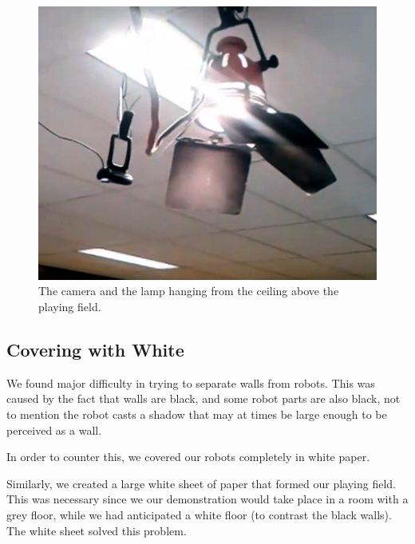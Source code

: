 \documentclass[10pt, abstracton]{scrartcl}
\begin{document}
\begin{figure}
	\centering
	\includegraphics[width=\columnwidth]{pictures/photo2.png}
	\caption{\small The camera and the lamp hanging from the ceiling above the playing field.}
	\label{fig:photo2}
\end{figure}

\subsection{Covering with White}
We found major difficulty in trying to separate walls from robots. This was caused by the fact that walls are black, and some robot parts are also black, not to mention the robot casts a shadow that may at times be large enough to be perceived as a wall.

In order to counter this, we covered our robots completely in white paper.

Similarly, we created a large white sheet of paper that formed our playing field. This was necessary since we our demonstration would take place in a room with a grey floor, while we had anticipated a white floor (to contrast the black walls). The white sheet solved this problem.




\clearpage
\end{document}
